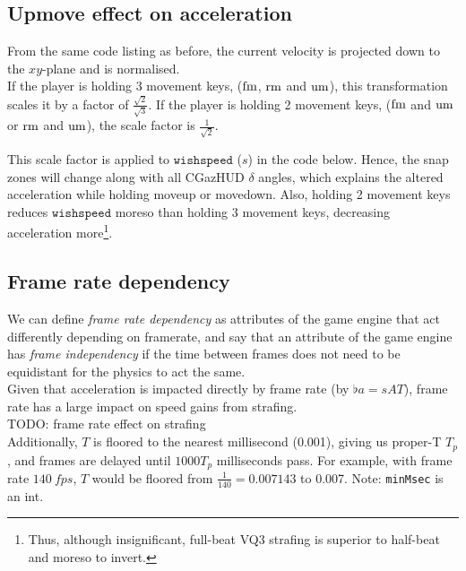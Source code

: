 \subsection{Upmove effect on acceleration}
\label{sec:upmove}
From the same code listing as before, the current velocity is projected down to the $xy$-plane and is normalised.\\
If the player is holding 3 movement keys, ($\operatorname{fm}$, $\operatorname{rm}$ and $\operatorname{um}$), this transformation scales it by a factor of $\frac{\sqrt{2}}{\sqrt{3}}$.
If the player is holding 2 movement keys, ($\operatorname{fm}$ and $\operatorname{um}$ or $\operatorname{rm}$ and $\operatorname{um}$), the scale factor is $\frac{1}{\sqrt{2}}$.

This scale factor is applied to $\texttt{wishspeed}$ ($s$) in the code below.
Hence, the snap zones will change along with all CGazHUD $\delta$ angles, which explains the altered acceleration while holding moveup or movedown.
Also, holding 2 movement keys reduces $\texttt{wishspeed}$ moreso than holding 3 movement keys, decreasing acceleration more\footnote{Thus, although insignificant, full-beat VQ3 strafing is superior to half-beat and moreso to invert.}.


\subsection{Frame rate dependency}
\label{sec:framerate}
We can define \emph{frame rate dependency} as attributes of the game engine that act differently depending on framerate,
and say that an attribute of the game engine has \emph{frame independency} if the time between frames does not need to be equidistant for the physics to act the same.\\

Given that acceleration is impacted directly by frame rate (by $\flat{a} = sAT$), frame rate has a large impact on speed gains from strafing.\\
TODO: frame rate effect on strafing\\

Additionally, $T$ is floored to the nearest millisecond (0.001), giving us proper-T $T_p$, and frames are delayed until $1000T_p$ milliseconds pass.
For example, with frame rate $\qty{140}{fps}$, $T$ would be floored from $\frac{1}{140} = 0.007143$ to 0.007. Note: \texttt{minMsec} is an int.

